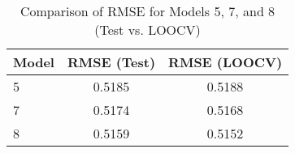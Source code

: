 
\begin{table}[ht]
\centering
\begin{tabular}{lcc}
\hline
Model & RMSE (Test) & RMSE (LOOCV) \\
\hline
5 &  0.5185  &  0.5188  \\
7 &  0.5174  &  0.5168  \\
8 &  0.5159  &  0.5152  \\
\hline
\end{tabular}
\caption{Comparison of RMSE for Models 5, 7, and 8 (Test vs. LOOCV)}
\label{tab:rmse_loocv}
\end{table}
